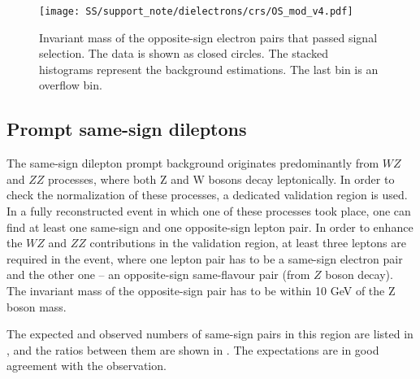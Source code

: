 \begin{figure}[h]
\begin{center}
\texttt{[image: SS/support\_note/dielectrons/crs/OS\_mod\_v4.pdf]}
\caption{Invariant mass of the opposite-sign electron pairs that passed signal selection.
The data is shown as closed circles. The stacked histograms represent the background estimations. 
The last bin is an overflow bin.
}
\label{fig:OS_CR}
\end{center}
\end{figure} 

\subsection{Prompt same-sign dileptons}

The same-sign dilepton prompt background originates predominantly from $WZ$ and $ZZ$ processes, where both Z and W bosons decay leptonically.
In order to check the normalization of these processes, a dedicated validation region is used.
In a fully reconstructed event in which one of these processes took place, one can find at least one same-sign and one opposite-sign lepton pair.
In order to enhance the $WZ$ and $ZZ$ contributions in the validation region, at least three leptons are required in the event, where one lepton pair
has to be a same-sign electron pair and the other one -- an opposite-sign same-flavour pair (from $Z$ boson decay). 
The invariant mass of the opposite-sign pair has to be within 10 GeV of the Z boson mass.

The expected and observed numbers of same-sign pairs in this region are listed in , 
and the ratios between them are shown in . 
The expectations are in good agreement with the observation.

